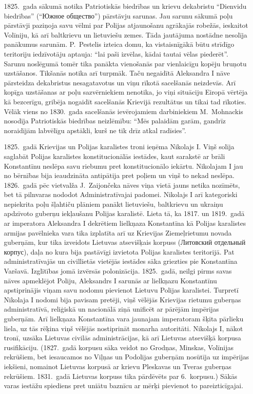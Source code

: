 \documentclass[twoside,a5paper,12pt,fleqn,openany]{extbook}
\newcommand{\rutxti}[1]{\textrussian{#1}}
\begin{document}
1825.~gada sākumā notika Patriotiskās biedrības un krievu dekabristu ``Dienvidu biedrības'' (``\rutxti{Южное общество}'') pārstāvju sarunas. Jau sarunu sākumā poļu pārstāvji paziņoja savu vēlmi par Polijas atjaunošanu agrākajās robežās, ieskaitot Volīniju, kā arī baltkrievu un lietuviešu zemes. Tāda jautājuma nostādne nesolīja panākumus sarunām. P.~Pestelis izteica domu, ka vistaisnīgākā būtu strīdīgo teritoriju iedzīvotāju aptauja: ``lai paši izvēlas, kādai tautai vēlas piederēt''. Sarunu noslēgumā tomēr tika panākta vienošanās par vienlaicīgu kopēju bruņotu uzstāšanos. Tikšanās notika arī turpmāk. Taču negaidītā Aleksandra I nāve pārsteidza dekabristus nesagatavotus un viņu rīkotā sacelšanās neizdevās. Arī kopīga uzstāšanas ar poļu sazvērniekiem nenotika, jo viņi situāciju Eiropā vērtēja kā bezcerīgu, gribēja nogaidīt sacelšanās Krievijā rezultātus un tikai tad rīkoties. Vēlāk viens no 1830.~gada sacelšanās ievērojamiem darbiniekiem M.~Mohnackis nosodīja Patriotiskās biedrības neizlēmību: ``Mēs palaidām garām, gandrīz noraidījām labvēlīgu apstākli, kurš ne tik drīz atkal radīsies''.

1825.~gadā Krievijas un Polijas karalistes troni ieņēma Nikolajs I. Viņš solīja saglabāt Polijas karalistes konstitucionālās iestādes, kaut sarakstē ar brāli Konstantīnu neslēpa savu riebumu pret konstitucionālo iekārtu. Nikolajam I jau no bērnības bija ieaudzināta antipātija pret poļiem un viņš to nekad neslēpa. 1826.~gadā pēc vietvalža J.~Zaijončeka nāves viņa vietā jauns netika nozīmēts, bet tā pilnvaras nododot Administratīvajai padomei. Nikolajs I arī kategoriski nepiekrita poļu šļahtiču plāniem panākt lietuviešu, baltkrievu un ukraiņu apdzīvoto guberņu iekļaušanu Polijas karalistē. Lieta tā, ka 1817. un 1819.~gadā ar imperatora Aleksandra I dekrētiem lielkņaza Konstantīna kā Polijas karalistes armijas pavēlnieka vara tika izplatīta arī uz Krievijas Ziemeļrietumu novada guberņām, kur tika izveidots Lietuvas atsevišķais korpuss (\rutxti{Литовский отдельный корпус}), daļa no kura bija pastāvīgi izvietota Polijas karalistes teritorijā. Pat administratīvajās un civillietās vietējās iestādes sāka griezties pie Konstantīna Varšavā. Izglītības jomā izvērsās polonizācija. 1825.~gadā, neilgi pirms savas nāves apmeklējot Poliju, Aleksandrs I sarunās ar lielkņazu Konstantīnu apstiprinājis viņam savu nodomu pievienot Lietuvu Polijas karalistei. Turpretī Nikolaja I nodomi bija pavisam pretēji, viņš vēlējās Krievijas rietumu guberņas administratīvā, reliģiskā un nacionālā ziņā unificēt ar pārējām impērijas guberņām. Arī lielkņaza Konstantīna vara jaunajam imperatoram šķita pārlieku liela, uz tās rēķina viņš vēlējās nostiprināt monarha autoritāti. Nikolajs I, nākot tronī, uzsāka Lietuvas civilās administrācijas, kā arī Lietuvas atsevišķā korpusa rusifikāciju. (1827.~gadā korpusu sāka veidot no Grodņas, Minskas, Volīnijas rekrūšiem, bet iesaucamos no Viļņas un Podolijas guberņām nosūtīja uz impērijas iekšieni, nomainot Lietuvas korpusā ar krievu Pleskavas un Tveras guberņas rekrūšiem. 1831.~gadā Lietuvas korpuss tika pārdēvēts par 6.~korpusu.) Sākās varas iestāžu spiediens pret uniātu baznīcu ar mērķi pievienot to pareizticīgajai.
\end{document}
